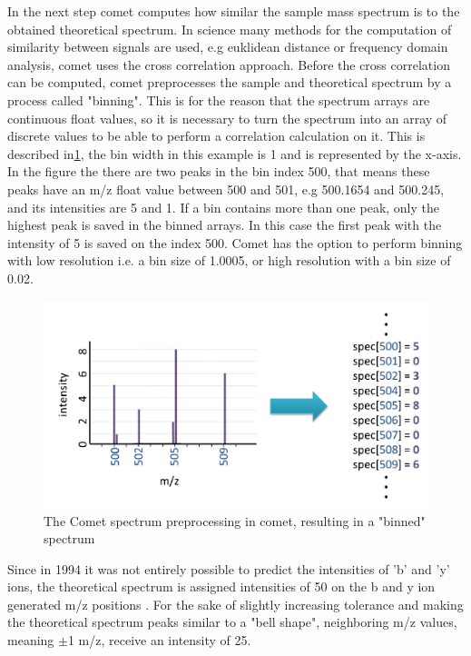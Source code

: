 \documentclass[11pt]{article}
\begin{document}
In the next step comet computes how similar the sample mass spectrum is to the obtained theoretical spectrum. In science many methods for the computation of similarity between signals are used, e.g euklidean distance or frequency domain analysis, comet uses the cross correlation approach. Before the cross correlation can be computed, comet preprocesses the sample and theoretical spectrum by a process called "binning". This is for the reason that the spectrum arrays are continuous float values, so it is necessary to turn the spectrum into an array of discrete values to be able to perform a correlation calculation on it. This is described in\cref{fig:binning}, the bin width in this example is 1 and is represented by the x-axis. In the figure the there are two peaks in the bin index 500, that means these peaks have an m/z float value between 500 and 501, e.g 500.1654 and 500.245, and its intensities are 5 and 1. If a bin contains more than one peak, only the highest peak is saved in the binned arrays. In this case the first peak with the intensity of 5 is saved on the index 500. Comet has the option to perform binning with low resolution i.e. a bin size of 1.0005, or high resolution with a bin size of 0.02. 
\begin{figure}[ht]
\centering
\includegraphics[width=1\textwidth]{figs/binning.png}
\caption{The Comet spectrum preprocessing in comet, resulting in a "binned" spectrum \cite{deeper-look-into-comet}}
\label{fig:binning}
\end{figure}
Since in 1994 it was not entirely possible to predict the intensities of 'b' and 'y' ions, the theoretical spectrum is assigned intensities of 50 on the b and y ion generated m/z positions \cite{deeper-look-into-comet}. For the sake of slightly increasing tolerance and making the theoretical spectrum peaks similar to a "bell shape", neighboring m/z values, meaning $\pm$1 m/z, receive an intensity of 25. 
\end{document}
